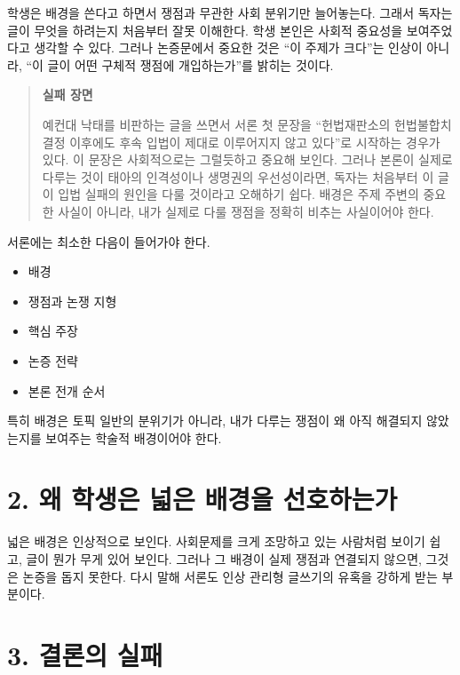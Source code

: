 학생은 배경을 쓴다고 하면서 쟁점과 무관한 사회 분위기만 늘어놓는다. 그래서 독자는 글이 무엇을 하려는지 처음부터 잘못 이해한다. 학생 본인은 사회적 중요성을 보여주었다고 생각할 수 있다. 그러나 논증문에서 중요한 것은 ``이 주제가 크다''는 인상이 아니라, ``이 글이 어떤 구체적 쟁점에 개입하는가''를 밝히는 것이다.

\begin{quote}
\textbf{실패 장면}

예컨대 낙태를 비판하는 글을 쓰면서 서론 첫 문장을 ``헌법재판소의 헌법불합치 결정 이후에도 후속 입법이 제대로 이루어지지 않고 있다''로 시작하는 경우가 있다. 이 문장은 사회적으로는 그럴듯하고 중요해 보인다. 그러나 본론이 실제로 다루는 것이 태아의 인격성이나 생명권의 우선성이라면, 독자는 처음부터 이 글이 입법 실패의 원인을 다룰 것이라고 오해하기 쉽다. 배경은 주제 주변의 중요한 사실이 아니라, 내가 실제로 다룰 쟁점을 정확히 비추는 사실이어야 한다.
\end{quote}

서론에는 최소한 다음이 들어가야 한다.

\begin{itemize}
\tightlist
\item
  배경
\item
  쟁점과 논쟁 지형
\item
  핵심 주장
\item
  논증 전략
\item
  본론 전개 순서
\end{itemize}

특히 배경은 토픽 일반의 분위기가 아니라, 내가 다루는 쟁점이 왜 아직 해결되지 않았는지를 보여주는 학술적 배경이어야 한다.

\section{2. 왜 학생은 넓은 배경을 선호하는가}\label{2-uxc65c-uxd559uxc0dduxc740-uxb113uxc740-uxbc30uxacbduxc744-uxc120uxd638uxd558uxb294uxac00}

넓은 배경은 인상적으로 보인다. 사회문제를 크게 조망하고 있는 사람처럼 보이기 쉽고, 글이 뭔가 무게 있어 보인다. 그러나 그 배경이 실제 쟁점과 연결되지 않으면, 그것은 논증을 돕지 못한다. 다시 말해 서론도 인상 관리형 글쓰기의 유혹을 강하게 받는 부분이다.

\section{3. 결론의 실패}\label{3-uxacb0uxb860uxc758-uxc2e4uxd328}

